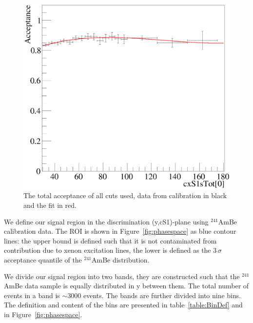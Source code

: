 \begin{figure}[t!]
\begin{minipage}{0.9\linewidth}
\centerline{\includegraphics[width=1.\linewidth]{Figures/Acceptance.eps}}
\end{minipage}
\caption{The total acceptance of all cuts used, data from calibration in black and the fit in red.}
\label{fig:Acc}
\end{figure}

We define our signal region in the discrimination (y,cS1)-plane using $^{241}$AmBe calibration data. 
The ROI is shown in Figure~\ref{fig:phasespace} as blue contour lines: the upper bound is defined such that it is not contaminated from contribution due to xenon excitation lines, the lower is defined as the 3\,$\sigma$ acceptance quantile of the $^{241}$AmBe distribution.

We divide our signal region into two bands, they are constructed such that the $^{241}$AmBe data sample is equally distributed in y between them. The total number of events in a band is $\sim3000$ events. The bands are further divided into nine bins. The definition and content of the bins are presented in table~\ref{table:BinDef} and in Figure~\ref{fig:phasespace}. 



